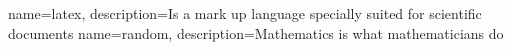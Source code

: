 {
    name=latex,
    description={Is a mark up language specially suited
    for scientific documents}
}
{
    name=random,
    description={Mathematics is what mathematicians do}
}
